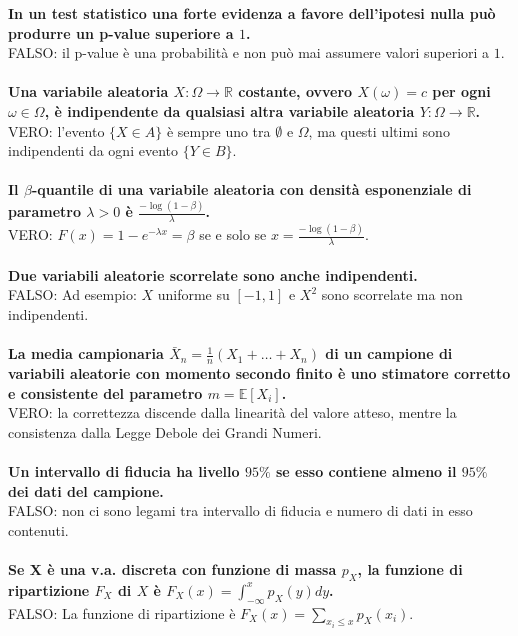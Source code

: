 \noindent\textbf{In un test statistico una forte evidenza a favore dell'ipotesi nulla può produrre un p-value superiore a $1$.}\\
FALSO: il p-value è una probabilità e non può mai assumere valori superiori a $1$.\\\\

\noindent\textbf{Una variabile aleatoria $X : \Omega \to \mathbb{R}$ costante, ovvero $X(\omega) = c$ per ogni $\omega \in \Omega$, è indipendente da qualsiasi altra variabile aleatoria $Y : \Omega \to \mathbb{R}$.}\\
VERO: l’evento $\{X \in A\}$ è sempre uno tra $\emptyset$ e $\Omega$, ma questi ultimi sono indipendenti da ogni evento $\{Y \in B\}$.\\\\

\noindent\textbf{Il $\beta$-quantile di una variabile aleatoria con densità esponenziale di parametro $\lambda > 0$ è $\frac{- \log(1 - \beta)}{\lambda}$.}\\
VERO: $F (x) = 1 - e^{-\lambda x} = \beta$ se e solo se $x = \frac{-\log(1 - \beta)}{\lambda}$.\\\\

\noindent\textbf{Due variabili aleatorie scorrelate sono anche indipendenti.}\\
FALSO: Ad esempio: $X$ uniforme su $[-1, 1]$ e $X^2$ sono scorrelate ma non indipendenti.\\\\

\noindent\textbf{La media campionaria $\bar{X}_n = \frac{1}{n}(X_1 + \ldots + X_n )$ di un campione di variabili aleatorie con momento secondo finito è uno stimatore corretto e consistente del parametro $m = \mathbb{E}[X_i ]$.}\\
VERO: la correttezza discende dalla linearità del valore atteso, mentre la consistenza dalla Legge Debole dei Grandi Numeri.\\\\

\noindent\textbf{Un intervallo di fiducia ha livello $95\%$ se esso contiene almeno il $95\%$ dei dati del campione.}\\
FALSO: non ci sono legami tra intervallo di fiducia e numero di dati in esso contenuti.\\\\

\noindent\textbf{Se X è una v.a. discreta con funzione di massa $p_X$, la funzione di ripartizione $F_X$ di $X$	è $F_X (x) =\int_{-\infty}^{x}p_X(y)dy$.}\\
FALSO: La funzione di ripartizione è $F_X(x)=\sum_{x_i \leq x}p_X(x_i)$.